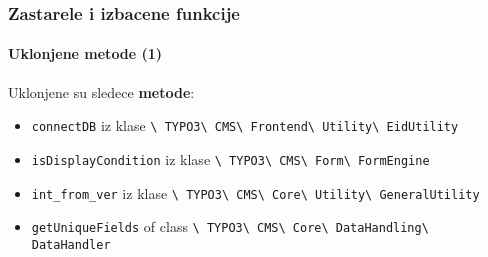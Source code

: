 \begin{frame}[fragile]
	\frametitle{Zastarele i izbacene funkcije}
	\framesubtitle{Uklonjene metode (1)}

	Uklonjene su sledece  \textbf{metode}:

	\begin{itemize}
		\item
			\small
				\texttt{connectDB}\newline
				iz klase
				\texttt{\textbackslash
					TYPO3\textbackslash
					CMS\textbackslash
					Frontend\textbackslash
					Utility\textbackslash
					EidUtility}
			\normalsize
		\item
			\small
				\texttt{isDisplayCondition}\newline
				iz klase
				\texttt{\textbackslash
					TYPO3\textbackslash
					CMS\textbackslash
					Form\textbackslash
					FormEngine}
			\normalsize
		\item
			\small
				\texttt{int\_from\_ver}\newline
				iz klase
				\texttt{\textbackslash
					TYPO3\textbackslash
					CMS\textbackslash
					Core\textbackslash
					Utility\textbackslash
					GeneralUtility}
			\normalsize
		\item
			\small
				\texttt{getUniqueFields}\newline
				of class
				\texttt{\textbackslash
					TYPO3\textbackslash
					CMS\textbackslash
					Core\textbackslash
					DataHandling\textbackslash
					DataHandler}
			\normalsize

	\end{itemize}

\end{frame}


